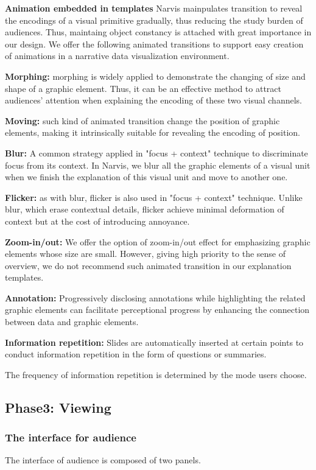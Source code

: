 \textbf{Animation embedded in templates }
Narvis mainpulates transition to reveal the encodings of a visual primitive gradually, thus reducing the study burden of audiences. Thus, maintaing object constancy is attached with great importance in our design. 
We offer the following animated transitions to support easy creation of animations in a narrative data visualization environment.\par 
\textbf{Morphing:} morphing is widely applied to demonstrate the changing of size and shape of a graphic element. Thus, it can be an effective method to attract audiences' attention when explaining the encoding of these two visual channels. \par
\textbf{Moving:} such kind of animated transition change the position of graphic elements, making it intrinsically suitable for revealing the encoding of position. \par 
\textbf{Blur:} A common strategy applied in "focus + context" technique to discriminate focus from its context. In Narvis, we blur all the graphic elements of a visual unit when we finish the explanation of this visual unit and move to another one. \par
\textbf{Flicker:} as with blur, flicker is also used in "focus + context" technique. Unlike blur, which  erase contextual details, flicker achieve minimal deformation of context but at the cost of introducing annoyance. \par
\textbf{Zoom-in/out:} We offer the option of zoom-in/out effect for emphasizing graphic elements whose size are small. However, giving high priority to the sense of overview, we do not recommend such animated transition in our explanation templates.  \par
\textbf{Annotation:} Progressively disclosing annotations while highlighting the related graphic elements can facilitate perceptional progress by enhancing the connection between data and graphic elements.\cite{bryan_temporal_2016}  \par
\textbf{Information repetition:} Slides are automatically inserted at certain points to conduct information repetition in the form of questions or summaries. \par 
The frequency of information repetition is determined by the mode users choose. \par
\subsection{Phase3: Viewing}
\subsubsection{The interface for audience}
The interface of audience is composed of two panels.

